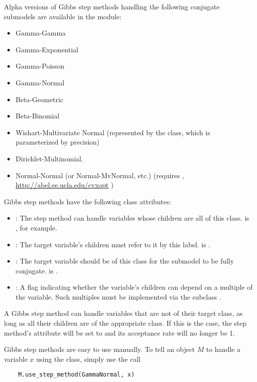 Alpha versions of Gibbs step methods handling the following conjugate submodels are available in the  module:
\begin{itemize}
    \item Gamma-Gamma
    \item Gamma-Exponential
    \item Gamma-Poisson
    \item Gamma-Normal
    \item Beta-Geometric
    \item Beta-Binomial
    \item Wishart-Multivariate Normal (represented by the  class, which is parameterized by precision)
    \item Dirichlet-Multinomial.
    \item Normal-Normal (or Normal-MvNormal, etc.) (requires , \href{http://abel.ee.ucla.edu/cvxopt}{http://abel.ee.ucla.edu/cvxopt} )
\end{itemize}

Gibbs step methods have the following class attributes:
\begin{itemize}
    \item {}: The step method can handle variables whose children are all of this class.  is , for example.
    \item {}: The target variable's children must refer to it by this label.  is .
    \item {}: The target variable should be of this class for the submodel to be fully conjugate.  is .
    \item {}: A flag indicating whether the variable's children can depend on a multiple of the variable. Such multiples must be implemented via the  subclass .
\end{itemize}

A Gibbs step method can handle variables that are not of their target class, as long as all their children are of the appropriate class. If this is the case, the step method's  attribute will be set to  and its acceptance rate will no longer be 1.

Gibbs step methods are easy to use manually. To tell an 
object $M$ to handle a variable $x$ using the  class,
simply use the call
\begin{verbatim}
    M.use_step_method(GammaNormal, x)
\end{verbatim}

